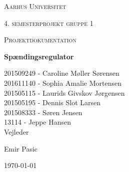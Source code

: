\thispagestyle{empty}
{\centering
	{\scshape\LARGE Aarhus Universitet \par}
	\vspace{1cm}
	{\scshape\Large 4. semesterprojekt gruppe 1\par}
	{\scshape\Large Projektdokumentation\par}
	\vspace{1.5cm}
	{\huge\bfseries Spændingsregulator\par}
	\vspace{2cm}
	{\Large
		201509249 - Caroline Møller Sørensen\\
		201611140 - Sophia Amalie Mortensen\\
		201505115 - Laurids Givskov Jørgensen\\		
		201505195 - Dennis Slot Larsen \\
		201508333 - Søren Jensen\\
		13114 - Jeppe Hansen\\  }
	\vfill
	Vejleder\par
	Emir Pasic
	
	\vfill
	
	{\large \today\par}
	\par}



